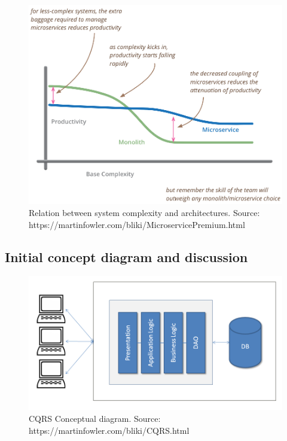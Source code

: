 \begin{figure}[H]
    \centering
    \includegraphics[width=1\textwidth]{monolith_vs_microservice}
    \caption{Relation between system complexity and architectures. Source: https://martinfowler.com/bliki/MicroservicePremium.html}
    \label{fig:monolith_vs_microservice}
\end{figure}

\subsection{Initial concept diagram and discussion}\label{subsec:initial-concept-diagram}
\begin{figure}[H]
    \centering
    \includegraphics[width=1\textwidth]{monolith_architecture}
    \caption{CQRS Conceptual diagram. Source: https://martinfowler.com/bliki/CQRS.html}\label{fig:figure2}
\end{figure}

